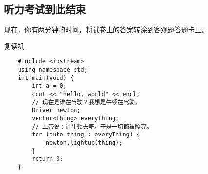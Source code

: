 \documentclass{dreamClass}
\begin{document}
\subsection{听力考试到此结束}
现在，你有两分钟的时间，将试卷上的答案转涂到客观题答题卡上。
\begin{codeblock}
    \caption{复读机\label{code:junk-again}}
    \begin{verbatim}
    #include <iostream>
    using namespace std;
    int main(void) {
        int a = 0;
        cout << "hello, world" << endl;
        // 现在是谁在驾驶？我想是牛顿在驾驶。
        Driver newton;
        vector<Thing> everyThing;
        // 上帝说：让牛顿去吧。于是一切都被照亮。
        for (auto thing : everyThing) {
            newton.lightup(thing);
        }
        return 0;
    }
    \end{verbatim}
\end{codeblock}
\end{document}
